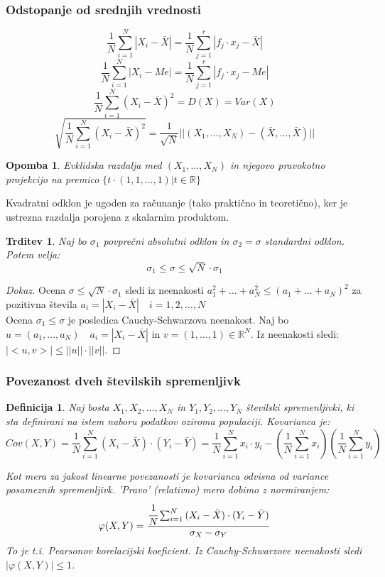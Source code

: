 \documentclass[11pt]{article}
\newtheorem{Trditev}[Izrek]{{\sc Trditev}}
\newtheorem{Definicija}[Izrek]{{\sc Definicija}}
\newtheorem{Opomba}[Izrek]{{\sc Opomba}}
\newenvironment{dokaz}[1][{\sc Dokaz}]{\begin{proof}[#1]\renewcommand*{\qedsymbol}{\(\blacksquare\)}}{\end{proof}}
\begin{document}
\subsubsection{Odstopanje od srednjih vrednosti}
	$$\frac{1}{N}\sum_{i = 1}^{N}{|X_i - \bar{X}|} = \frac{1}{N}\sum_{j = 1}^{r}{|f_j \cdot x_j - \bar{X}|}$$
	$$\frac{1}{N}\sum_{i = 1}^{N}{|X_i - Me|} = \frac{1}{N}\sum_{j = 1}^{r}{|f_j \cdot x_j - Me|}$$
	$$\frac{1}{N}\sum_{i = 1}^{N}{(X_i - \bar{X})^2} = D(X) = Var(X)$$
	$$\sqrt{\frac{1}{N}\sum_{i = 1}^{N}{(X_i - \bar{X})^2}} = \frac{1}{\sqrt{N}}||(X_1, \ldots ,X_N) - (\bar{X},\ldots ,\bar{X}) || $$
\begin{Opomba}
	Evklidska razdalja med $(X_1, \ldots , X_N) $  in njegovo pravokotno projekcijo na premico $\{ t \cdot (1,1, \ldots, 1) | t\in \mathbb{R} \}$
\end{Opomba}	

Kvadratni odklon je ugoden za računanje (tako praktično in teoretično), ker je ustrezna razdalja porojena z skalarnim produktom.
\begin{Trditev}
	Naj bo $\sigma_1$ povprečni absolutni odklon in $\sigma_2 = \sigma$ standardni odklon. Potem velja:
	$$\sigma_1 \le \sigma \le  \sqrt{N} \cdot \sigma_1$$
\end{Trditev}
\begin{dokaz}
	Ocena $\sigma \le  \sqrt{N} \cdot \sigma_1$ sledi iz neenakosti $a_1^2 +\ldots + a_N^2 \le (a_1 + \ldots + a_N)^2$ za pozitivna števila $a_i = |X_i - \bar{X}| \quad i= 1,2,\ldots,N$
	\\
	Ocena $\sigma_1 \le \sigma$ je posledica Cauchy-Schwarzova neenakost. Naj bo $u = (a_1, \ldots, a_N) \quad   a_i = |X_i - \bar{X}|$ in $v= (1,\ldots, 1) \in \mathbb{R}^N$. Iz neenakosti sledi: $|<u,v>| \le||u|| \cdot ||v||$.
\end{dokaz}

\subsubsection{Povezanost dveh  številskih spremenljivk}
\begin{Definicija}
	Naj bosta $X_1, X_2, \ldots, X_N$ in $Y_1,Y_2,\ldots, Y_N$ številski spremenljivki, ki sta definirani na istem naboru podatkov oziroma populaciji. Kovarianca je:
	$$Cov(X,Y) = \frac{1}{N}\sum_{i = 1}^{N}{(X_i - \bar{X})\cdot (Y_i - \bar{Y})} = \frac{1}{N}\sum_{i = 1}^{N}{x_i \cdot y_i} - \left(\frac{1}{N}  \sum_{i = 1}^{N}{x_i}\right)\left( \frac{1}{N}\sum_{i = 1}^{N}{y_i}\right)$$
	
	Kot mera za jakost linearne povezanosti je kovarianca odvisna od variance posameznih spremenljivk. 'Pravo' (relativno) mero dobimo z normiranjem:
	$$\varphi(X,Y) = \frac{\cfrac{1}{N}\sum_{i = 1}^{N}{(X_i - \bar{X})\cdot (Y_i - \bar{Y})} }{\sigma_X - \sigma_Y}$$
	To je t.i. Pearsonov korelacijski koeficient. Iz Cauchy-Schwarzove neenakosti sledi $|\varphi(X,Y)| \le 1$.
\end{Definicija}
	
\end{document}
